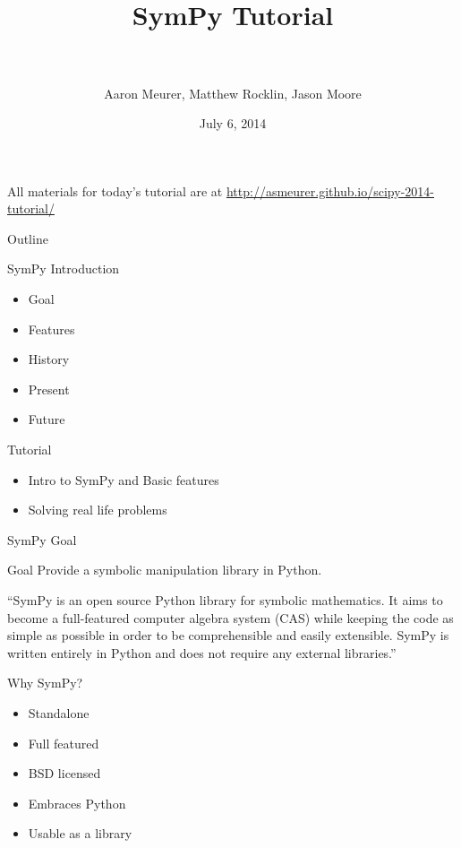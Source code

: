 \documentclass[xcolor=svgnames]{beamer}
\title[SymPy\hspace{4em}\insertframenumber/
\inserttotalframenumber]{~\\ SymPy Tutorial \\~}
\author[A. Meurer, Matthew Rocklin, Jason Moore]
{Aaron Meurer, Matthew Rocklin, Jason Moore}
\institute{\pgfuseimage{mylogo}}
\date{July 6, 2014}
\begin{document}
\begin{frame}
  \maketitle
\begin{center}
\normalsize All materials for today's tutorial are at \url{http://asmeurer.github.io/scipy-2014-tutorial/}
\end{center}
\end{frame}

\begin{frame}{Outline}
  \begin{block}{SymPy Introduction}
    \begin{itemize}
    \item Goal
    \item Features
    \item History
    \item Present
    \item Future
    \end{itemize}
  \end{block}

  \begin{block}{Tutorial}
    \begin{itemize}
    \item Intro to SymPy and Basic features
    \item Solving real life problems
    \end{itemize}
  \end{block}
\end{frame}

\begin{frame}{SymPy Goal}
  \begin{block}{Goal}
    Provide a symbolic manipulation library in Python.
  \end{block}
  \pause
  \begin{block}

    ``SymPy is an open source Python library for symbolic mathematics. It aims to
    become a full-featured computer algebra system (CAS) while keeping the code as
    simple as possible in order to be comprehensible and easily extensible. SymPy
    is written entirely in Python and does not require any external libraries.''

  \end{block}
\end{frame}

\begin{frame}{Why SymPy?}
  \begin{block}{}
    \begin{itemize}
      \item Standalone
      \item Full featured
      \item BSD licensed
      \item Embraces Python
      \item Usable as a library
    \end{itemize}
  \end{block}
\end{frame}
\end{document}
